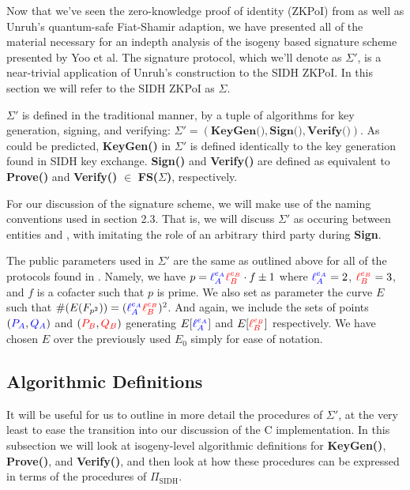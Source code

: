 Now that we've seen the zero-knowledge proof of identity (ZKPoI) from \cite{djp} as well as Unruh's quantum-safe Fiat-Shamir adaption, we have presented all of the material necessary for an indepth analysis of the isogeny based signature scheme presented by Yoo et al. The signature protocol, which we'll denote as $\Sigma'$, is a near-trivial application of Unruh's construction to the SIDH ZKPoI. In this section we will refer to the SIDH ZKPoI as $\Sigma$.

$\Sigma'$ is defined in the traditional manner, by a tuple of algorithms for key generation, signing, and verifying: $\Sigma' = (\textbf{KeyGen()}, \textbf{Sign()}, \textbf{Verify()})$. As could be predicted, \textbf{KeyGen()} in $\Sigma'$ is defined identically to the key generation found in SIDH key exchange. \textbf{Sign()} and \textbf{Verify()} are defined as equivalent to \textbf{Prove()} and \textbf{Verify()} $\in$ \textbf{FS($\Sigma$)}, respectively.

For our discussion of the signature scheme, we will make use of the naming conventions used in section 2.3. That is, we will discuss $\Sigma'$ as occuring between entities \bob and \alice, with \bob imitating the role of an arbitrary third party \randall during \textbf{Sign}.

The public parameters used in $\Sigma'$ are the same as outlined above for all of the protocols found in \cite{djp}. Namely, we have $p = \textcolor{blue}{\ell_{A}^{e_A}}\textcolor{red}{\ell_{B}^{e_B}} \cdot f \pm 1$ where $\textcolor{blue}{\ell_{A}^{e_A}} = 2$, $\textcolor{red}{\ell_{B}^{e_B}} = 3$, and $f$ is a cofacter such that $p$ is prime. We also set as parameter the curve $E$ such that $\#(E(F_{p^2})) = (\textcolor{blue}{\ell_{A}^{e_A}}\textcolor{red}{\ell_{B}^{e_B}})^2$. And again, we include the sets of points $(\textcolor{blue}{P_A}, \textcolor{blue}{Q_A})$ and $(\textcolor{red}{P_B}, \textcolor{red}{Q_B})$ generating $E[\textcolor{blue}{\ell_{A}^{e_A}}]$ and $E[\textcolor{red}{\ell_{B}^{e_B}}]$ respectively. We have chosen $E$ over the previously used $E_0$ simply for ease of notation.

\subsection{Algorithmic Definitions}

It will be useful for us to outline in more detail the procedures of $\Sigma'$, at the very least to ease the transition into our discussion of the C implementation. In this subsection we will look at isogeny-level algorithmic definitions for \textbf{KeyGen()}, \textbf{Prove()}, and \textbf{Verify()}, and then look at how these procedures can be expressed in terms of the procedures of $\Pi_{\text{SIDH}}$.\\


